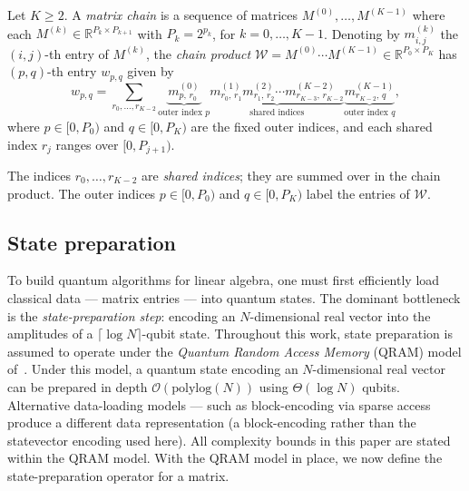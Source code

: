 \documentclass[a4paper,UKenglish,cleveref,autoref,thm-restate]{socg-lipics-v2021}
\begin{document}
\begin{definition}\label{def:chain}
  Let $K \geq 2$.
  A \emph{matrix chain} is a sequence of matrices
  $M^{(0)}, \ldots, M^{(K-1)}$ where each
  $M^{(k)} \in \mathbb{R}^{P_k \times P_{k+1}}$ with
  $P_k = 2^{p_k}$, %
  for $k = 0, \ldots, K-1$.
  Denoting by $m^{(k)}_{i,j}$ the $(i,j)$-th entry of $M^{(k)}$,
  the \emph{chain product} $\mathcal{W} = M^{(0)}\cdots M^{(K-1)} \in
  \mathbb{R}^{P_0 \times P_K}$ has $(p,q)$-th entry $w_{p,q}$
  given by
\begin{equation*}
    w_{p,q} =
      \sum_{r_0,\ldots,r_{K-2}}
      \underbrace{m^{(0)}_{p,\,r_0}}_{\text{outer index }p}
      \underbrace{ m^{(1)}_{r_{0},\,r_1}m^{(2)}_{r_{1},\,r_2}\cdots m^{(K-2)}_{r_{K-3},\,r_{K-2}}}_{\text{shared indices}}
      \underbrace{m^{(K-1)}_{r_{K-2},\,q}}_{\text{outer index }q},
  \end{equation*}
  where $p \in [0,P_0)$ and $q \in [0,P_{K})$ are the fixed outer
  indices, and each shared index $r_j$ ranges over $[0, P_{j+1})$.
\end{definition}

The indices $r_0, \ldots, r_{K-2}$ are \emph{shared indices}; they are
summed over in the chain product.
The outer indices $p \in [0, P_0)$ and $q \in [0, P_K)$ label the
entries of $\mathcal{W}$.


\subsection{State preparation}
\label{sec:prelim:sp}
To build quantum algorithms for linear algebra, one must first
efficiently load classical data --- matrix entries --- into quantum states.
The dominant bottleneck is the \emph{state-preparation step}: encoding
an $N$-dimensional real vector into the amplitudes of a
$\lceil\log N\rceil$-qubit state.
Throughout this work, state preparation is assumed to operate under the
\emph{Quantum Random Access Memory} (QRAM) model
of~\cite{berti2025efficient, kerenidis_et_al:LIPIcs.ITCS.2017.49}.
Under this model, a quantum state encoding an $N$-dimensional real vector can be prepared in depth $\mathcal{O}(\mathrm{polylog} (N))$ using
$\Theta(\log N)$ qubits.
Alternative data-loading models --- such as block-encoding via sparse
access~\cite{chakraborty_et_al:LIPIcs.ICALP.2019.33} produce a different data representation (a block-encoding
rather than the statevector encoding used here).
All complexity bounds in this paper are stated within the QRAM model. With the QRAM model in place, we now define the state-preparation
operator for a matrix.
\end{document}
